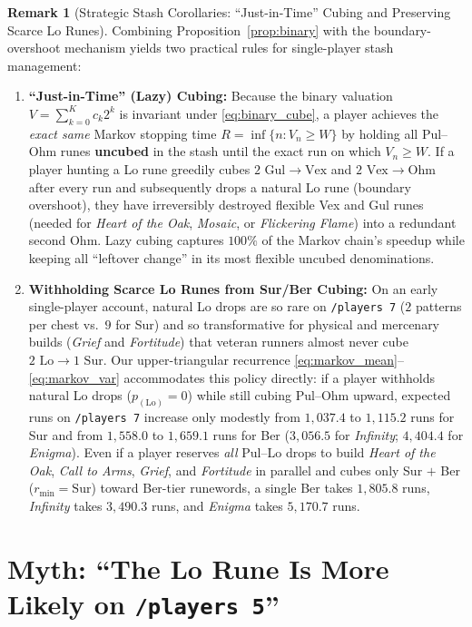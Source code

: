 \documentclass[11pt,reqno]{amsart}
\theoremstyle{definition}
\newtheorem{remark}[theorem]{Remark}
\begin{document}
\begin{remark}[Strategic Stash Corollaries: ``Just-in-Time'' Cubing and Preserving Scarce Lo Runes]
\label{rem:lazy_cubing}
Combining Proposition~\ref{prop:binary} with the boundary-overshoot mechanism yields two practical rules for single-player stash management:
\begin{enumerate}
    \item \textbf{``Just-in-Time'' (Lazy) Cubing:} Because the binary valuation $V = \sum_{k=0}^K c_k 2^k$ is invariant under \eqref{eq:binary_cube}, a player achieves the \emph{exact same} Markov stopping time $R = \inf\{n : V_n \ge W\}$ by holding all Pul--Ohm runes \textbf{uncubed} in the stash until the exact run on which $V_n \ge W$. If a player hunting a Lo rune greedily cubes $2\text{ Gul} \to \text{Vex}$ and $2\text{ Vex} \to \text{Ohm}$ after every run and subsequently drops a natural Lo rune (boundary overshoot), they have irreversibly destroyed flexible Vex and Gul runes (needed for \emph{Heart of the Oak}, \emph{Mosaic}, or \emph{Flickering Flame}) into a redundant second Ohm. Lazy cubing captures $100\%$ of the Markov chain's speedup while keeping all ``leftover change'' in its most flexible uncubed denominations.
    \item \textbf{Withholding Scarce Lo Runes from Sur/Ber Cubing:} On an early single-player account, natural Lo drops are so rare on \texttt{/players~7} ($2$ patterns per chest vs.\ $9$ for Sur) and so transformative for physical and mercenary builds (\emph{Grief} and \emph{Fortitude}) that veteran runners almost never cube $2\text{ Lo} \to 1\text{ Sur}$. Our upper-triangular recurrence \eqref{eq:markov_mean}--\eqref{eq:markov_var} accommodates this policy directly: if a player withholds natural Lo drops ($p_{(\text{Lo})} = 0$) while still cubing Pul--Ohm upward, expected runs on \texttt{/players~7} increase only modestly from $1{,}037.4$ to $1{,}115.2$ runs for Sur and from $1{,}558.0$ to $1{,}659.1$ runs for Ber ($3{,}056.5$ for \emph{Infinity}; $4{,}404.4$ for \emph{Enigma}). Even if a player reserves \emph{all} Pul--Lo drops to build \emph{Heart of the Oak}, \emph{Call to Arms}, \emph{Grief}, and \emph{Fortitude} in parallel and cubes only Sur $+$ Ber ($r_{\min} = \text{Sur}$) toward Ber-tier runewords, a single Ber takes $1{,}805.8$ runs, \emph{Infinity} takes $3{,}490.3$ runs, and \emph{Enigma} takes $5{,}170.7$ runs.
\end{enumerate}
\end{remark}

\section{Myth: ``The Lo Rune Is More Likely on \texttt{/players 5}''}
\label{sec:p5myth}
\end{document}
